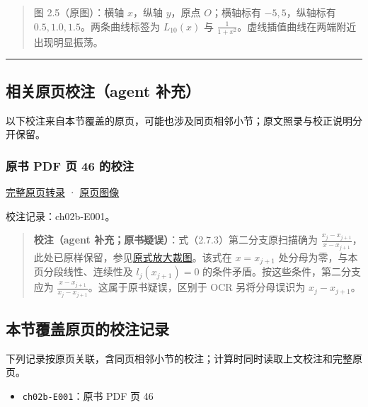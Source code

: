 \documentclass[
  10pt,
  fontset=fandol]{ctexart}
\providecommand{\tightlist}{%
  \setlength{\itemsep}{0pt}\setlength{\parskip}{0pt}}
\begin{document}
\begin{quote}
图 2.5（原图）：横轴 \(x\)，纵轴 \(y\)，原点 \(O\)；横轴标有 \(-5,5\)，纵轴标有 \(0.5,1.0,1.5\)。两条曲线标签为 \(L_{10}(x)\) 与 \(\frac{1}{1+x^2}\)。虚线插值曲线在两端附近出现明显振荡。
\end{quote}

\begin{center}\rule{0.5\linewidth}{0.5pt}\end{center}

\subsection{相关原页校注（agent 补充）}\label{ux76f8ux5173ux539fux9875ux6821ux6ce8agent-ux8865ux5145}

以下校注来自本节覆盖的原页，可能也涉及同页相邻小节；原文照录与校正说明分开保留。

\subsubsection{原书 PDF 页 46 的校注}\label{ux539fux4e66-pdf-ux9875-46-ux7684ux6821ux6ce8}

\href{../pages/pdf-046.md}{完整原页转录} · \href{../../source-images/pdf-046.jpeg}{原页图像}

校注记录：ch02b-E001。

\begin{quote}
\textbf{校注（agent 补充；原书疑误）}：式（2.7.3）第二分支原扫描确为 \(\frac{x_j-x_{j+1}}{x-x_{j+1}}\)，此处已原样保留，参见\href{../assets/ch02b/pdf-046-eq-2-7-3-detail.png}{原式放大裁图}。该式在 \(x=x_{j+1}\) 处分母为零，与本页分段线性、连续性及 \(l_j(x_{j+1})=0\) 的条件矛盾。按这些条件，第二分支应为 \(\frac{x-x_{j+1}}{x_j-x_{j+1}}\)。这属于原书疑误，区别于 OCR 另将分母误识为 \(x_j-x_{j+1}\)。
\end{quote}

\subsection{本节覆盖原页的校注记录}\label{ux672cux8282ux8986ux76d6ux539fux9875ux7684ux6821ux6ce8ux8bb0ux5f55}

下列记录按原页关联，含同页相邻小节的校注；计算时同时读取上文校注和完整原页。

\begin{itemize}
\tightlist
\item
  \texttt{ch02b-E001}：原书 PDF 页 46
\end{itemize}
\end{document}
